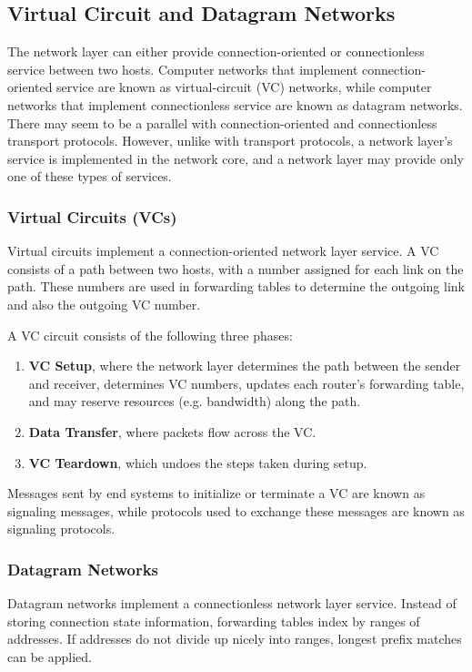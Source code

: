 \documentclass[12pt,titlepage]{article}
\begin{document}
    \subsection{Virtual Circuit and Datagram Networks}
      The network layer can either provide connection-oriented or connectionless service between two hosts. Computer networks that implement
      connection-oriented service are known as virtual-circuit (VC) networks, while computer networks that implement connectionless service
      are known as datagram networks. There may seem to be a parallel with connection-oriented and connectionless transport protocols. However,
      unlike with transport protocols, a network layer's service is implemented in the network core, and a network layer may provide only one of
      these types of services.

      \subsubsection{Virtual Circuits (VCs)}
        Virtual circuits implement a connection-oriented network layer service. A VC consists of a path between two hosts, with a number assigned
        for each link on the path. These numbers are used in forwarding tables to determine the outgoing link and also the outgoing VC number.

        A VC circuit consists of the following three phases:
        \begin{enumerate}
          \item \textbf{VC Setup}, where the network layer determines the path between the sender and receiver, determines VC numbers, updates
            each router's forwarding table, and may reserve resources (e.g. bandwidth) along the path.
          \item \textbf{Data Transfer}, where packets flow across the VC.
          \item \textbf{VC Teardown}, which undoes the steps taken during setup.
        \end{enumerate}

        Messages sent by end systems to initialize or terminate a VC are known as signaling messages, while protocols used to exchange these messages
        are known as signaling protocols.

      \subsubsection{Datagram Networks}
        Datagram networks implement a connectionless network layer service. Instead of storing connection state information, forwarding tables
        index by ranges of addresses. If addresses do not divide up nicely into ranges, longest prefix matches can be applied.
\end{document}

